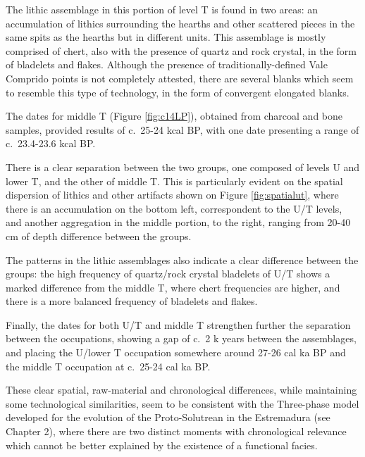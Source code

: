 \documentclass[12pt,twoside]{reedthesis}
\begin{document}
The lithic assemblage in this portion of level T is found in two areas: an accumulation of lithics surrounding the hearths and other scattered pieces in the same spits as the hearths but in different units. This assemblage is mostly comprised of chert, also with the presence of quartz and rock crystal, in the form of bladelets and flakes. Although the presence of traditionally-defined Vale Comprido points is not completely attested, there are several blanks which seem to resemble this type of technology, in the form of convergent elongated blanks.

The dates for middle T (Figure \ref{fig:c14LP}), obtained from charcoal and bone samples, provided results of c.~25-24 kcal BP, with one date presenting a range of c.~23.4-23.6 kcal BP.

There is a clear separation between the two groups, one composed of levels U and lower T, and the other of middle T. This is particularly evident on the spatial dispersion of lithics and other artifacts shown on Figure \ref{fig:spatialut}, where there is an accumulation on the bottom left, correspondent to the U/T levels, and another aggregation in the middle portion, to the right, ranging from 20-40 cm of depth difference between the groups.

The patterns in the lithic assemblages also indicate a clear difference between the groups: the high frequency of quartz/rock crystal bladelets of U/T shows a marked difference from the middle T, where chert frequencies are higher, and there is a more balanced frequency of bladelets and flakes.

Finally, the dates for both U/T and middle T strengthen further the separation between the occupations, showing a gap of c.~2 k years between the assemblages, and placing the U/lower T occupation somewhere around 27-26 cal ka BP and the middle T occupation at c.~25-24 cal ka BP.

These clear spatial, raw-material and chronological differences, while maintaining some technological similarities, seem to be consistent with the Three-phase model developed for the evolution of the Proto-Solutrean in the Estremadura (see Chapter 2), where there are two distinct moments with chronological relevance which cannot be better explained by the existence of a functional facies.
\end{document}
